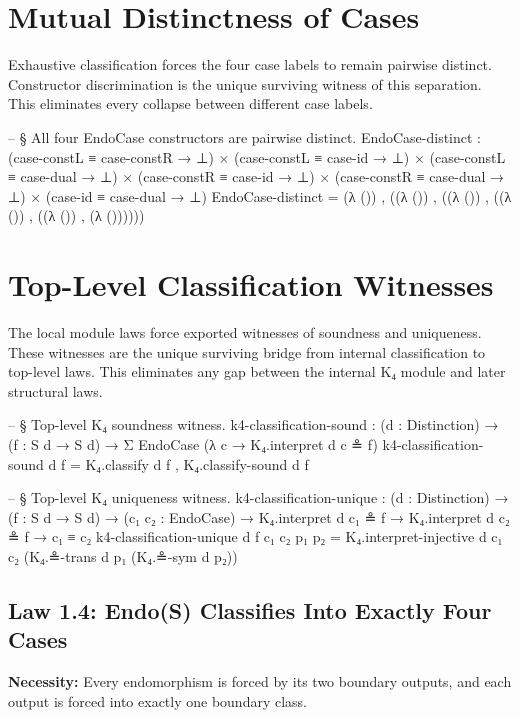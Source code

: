 \documentclass[11pt,a4paper]{book}
\def\texttt#1{#1}%
\begin{document}
\section{Mutual Distinctness of Cases}

Exhaustive classification forces the four case labels to remain pairwise distinct.
Constructor discrimination is the unique surviving witness of this separation.
This eliminates every collapse between different case labels.

\begin{code}
-- § All four EndoCase constructors are pairwise distinct.
EndoCase-distinct :
  (case-constL ≡ case-constR → ⊥) ×
  (case-constL ≡ case-id     → ⊥) ×
  (case-constL ≡ case-dual   → ⊥) ×
  (case-constR ≡ case-id     → ⊥) ×
  (case-constR ≡ case-dual   → ⊥) ×
  (case-id     ≡ case-dual   → ⊥)
EndoCase-distinct =
  (λ ()) ,
  ((λ ()) ,
   ((λ ()) ,
    ((λ ()) ,
     ((λ ()) ,
      (λ ())))))
\end{code}

\section{Top-Level Classification Witnesses}

The local module laws force exported witnesses of soundness and uniqueness.
These witnesses are the unique surviving bridge from internal classification to top-level laws.
This eliminates any gap between the internal \texttt{K₄} module and later structural laws.

\begin{code}
-- § Top-level K₄ soundness witness.
k4-classification-sound :
  (d : Distinction) →
  (f : S d → S d) →
  Σ EndoCase (λ c → K₄.interpret d c ≗ f)
k4-classification-sound d f = K₄.classify d f , K₄.classify-sound d f

-- § Top-level K₄ uniqueness witness.
k4-classification-unique :
  (d : Distinction) →
  (f : S d → S d) →
  (c₁ c₂ : EndoCase) →
  K₄.interpret d c₁ ≗ f →
  K₄.interpret d c₂ ≗ f →
  c₁ ≡ c₂
k4-classification-unique d f c₁ c₂ p₁ p₂ =
  K₄.interpret-injective d c₁ c₂ (K₄.≗-trans d p₁ (K₄.≗-sym d p₂))
\end{code}

\subsection{Law 1.4: Endo(S) Classifies Into Exactly Four Cases}

\textbf{Necessity:} Every endomorphism is forced by its two boundary outputs, and each output is forced into exactly one boundary class.
\end{document}
